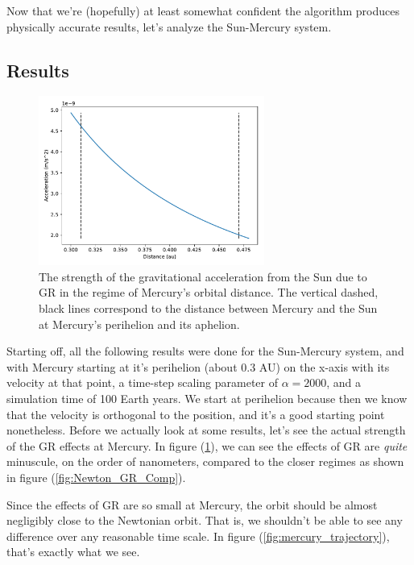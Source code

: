 \documentclass{report}
\begin{document}
            Now that we're (hopefully) at least somewhat confident the algorithm produces physically accurate results, let's analyze the Sun-Mercury system.

        \subsection{Results}

            \begin{figure}[h]
                \centering
                \includegraphics[width = 0.66\textwidth]{images/Newton_GR_Comp_Mercury.pdf}
                \caption{The strength of the gravitational acceleration from the Sun due to GR in the regime of Mercury's orbital distance.  The vertical dashed, black lines correspond to the distance between Mercury and the Sun at Mercury's perihelion and its aphelion.}
                \label{fig:GR_at_Mercury}
            \end{figure}
        
            Starting off, all the following results were done for the Sun-Mercury system, and with Mercury starting at it's perihelion (about 0.3 AU) on the x-axis with its velocity at that point, a time-step scaling parameter of $\alpha = 2000$, and a simulation time of 100 Earth years.  We start at perihelion because then we know that the velocity is orthogonal to the position, and it's a good starting point nonetheless.  Before we actually look at some results, let's see the actual strength of the GR effects at Mercury.  In figure (\ref{fig:GR_at_Mercury}), we can see the effects of GR are \emph{quite} minuscule, on the order of nanometers, compared to the closer regimes as shown in figure (\ref{fig:Newton_GR_Comp}).
            
            Since the effects of GR are so small at Mercury, the orbit should be almost negligibly close to the Newtonian orbit.  That is, we shouldn't be able to see any difference over any reasonable time scale.  In figure (\ref{fig:mercury_trajectory}), that's exactly what we see.
            
\end{document}
